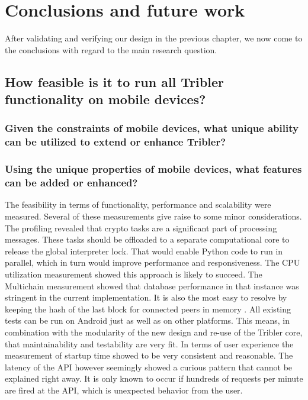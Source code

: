 \chapter{Conclusions and future work}
\label{ch:conclusions}
After validating and verifying our design in the previous chapter, we now come to the conclusions with regard to the main research question.

\section{How feasible is it to run all Tribler functionality on mobile devices?} %

\subsection{Given the constraints of mobile devices, what unique ability can be utilized to extend or enhance Tribler?}

\subsection{Using the unique properties of mobile devices, what features can be added or enhanced?}


The feasibility in terms of functionality, performance and scalability were measured.
Several of these measurements give raise to some minor considerations.
The profiling revealed that crypto tasks are a significant part of processing messages.
These tasks should be offloaded to a separate computational core to release the global interpreter lock.
That would enable Python code to run in parallel, which in turn would improve performance and responsiveness.
The CPU utilization measurement showed this approach is likely to succeed.
The Multichain measurement showed that database performance in that instance was stringent in the current implementation.
It is also the most easy to resolve by keeping the hash of the last block for connected peers in memory .
All existing tests can be run on Android just as well as on other platforms.
This means, in combination with the modularity of the new design and re-use of the Tribler core, that maintainability and testability are very fit.
In terms of user experience the measurement of startup time showed to be very consistent and reasonable.
The latency of the API however seemingly showed a curious pattern that cannot be explained right away.
It is only known to occur if hundreds of requests per minute are fired at the API, which is unexpected behavior from the user.


